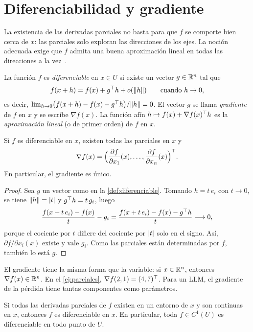 \section{Diferenciabilidad y gradiente}

La existencia de las derivadas parciales no basta para que $f$ se comporte bien cerca de $x$: las parciales solo exploran las direcciones de los ejes. La noción adecuada exige que $f$ admita una buena aproximación lineal en todas las direcciones a la vez~\cite[§5.2]{mml}.

\begin{definicion}\label{def:diferenciable}
La función $f$ es \emph{diferenciable} en $x\in U$ si existe un vector $g\in\mathbb{R}^{n}$ tal que
\[
f(x+h)=f(x)+g^{\top} h+o(\lVert h\rVert)\qquad\text{cuando } h\to 0,
\]
es decir, $\lim_{h\to 0}\bigl(f(x+h)-f(x)-g^{\top} h\bigr)/\lVert h\rVert=0$. El vector $g$ se llama \emph{gradiente} de $f$ en $x$ y se escribe $\nabla f(x)$. La función afín $h\mapsto f(x)+\nabla f(x)^{\top} h$ es la \emph{aproximación lineal} (o de primer orden) de $f$ en $x$.
\end{definicion}

\begin{proposicion}\label{prop:grad-parciales}
Si $f$ es diferenciable en $x$, existen todas las parciales en $x$ y
\[
\nabla f(x)=\Bigl(\frac{\partial f}{\partial x_1}(x),\dots,\frac{\partial f}{\partial x_n}(x)\Bigr)^{\top}.
\]
En particular, el gradiente es único.
\end{proposicion}

\begin{proof}
Sea $g$ un vector como en la \cref{def:diferenciable}. Tomando $h=t\,e_i$ con $t\to 0$, se tiene $\lVert h\rVert=\lvert t\rvert$ y $g^{\top} h=t\,g_i$, luego
\[
\frac{f(x+t\,e_i)-f(x)}{t}-g_i=\frac{f(x+t\,e_i)-f(x)-g^{\top} h}{t}\longrightarrow 0,
\]
porque el cociente por $t$ difiere del cociente por $\lvert t\rvert$ solo en el signo. Así, $\partial f/\partial x_i(x)$ existe y vale $g_i$. Como las parciales están determinadas por $f$, también lo está $g$.
\end{proof}

El gradiente tiene la misma forma que la variable: si $x\in\mathbb{R}^{n}$, entonces $\nabla f(x)\in\mathbb{R}^{n}$. En el \cref{ej:parciales}, $\nabla f(2,1)=(4,7)^{\top}$. Para un LLM, el gradiente de la pérdida tiene tantas componentes como parámetros.

\begin{teorema}\label{teo:C1}
Si todas las derivadas parciales de $f$ existen en un entorno de $x$ y son continuas en $x$, entonces $f$ es diferenciable en $x$. En particular, toda $f\in C^{1}(U)$ es diferenciable en todo punto de $U$.
\end{teorema}

